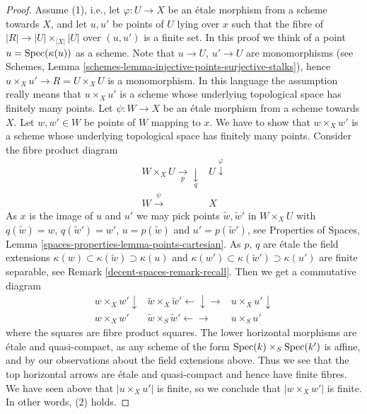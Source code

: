 \begin{proof}
Assume (1), i.e., let $\varphi : U \to X$ be an \'etale morphism from a scheme
towards $X$, and let $u, u'$ be points of $U$ lying over $x$
such that the fibre of $|R| \to |U| \times_{|X|} |U|$ over $(u, u')$
is a finite set. In this proof we think of a point $u = \operatorname{Spec}(\kappa(u))$
as a scheme. Note that $u \to U$, $u' \to U$ are monomorphisms (see
Schemes, Lemma \ref{schemes-lemma-injective-points-surjective-stalks}),
hence $u \times_X u' \to R = U \times_X U$ is a monomorphism.
In this language the assumption really means that
$u \times_X u'$ is a scheme whose underlying topological space has
finitely many points.
Let $\psi : W \to X$ be an \'etale morphism from a scheme towards $X$.
Let $w, w' \in W$ be points of $W$ mapping to $x$.
We have to show that $w \times_X w'$ is a scheme whose underlying topological
space has finitely many points.
Consider the fibre product diagram
$$
\begin{array}{cc}W \times_X U \underset{p}{\longrightarrow}\underset{q}{\downarrow} & U \overset{\varphi}{\downarrow} \\ W \overset{\psi}{\longrightarrow} & X\end{array}
$$
As $x$ is the image of $u$ and $u'$ we may pick points
$\tilde w, \tilde w'$ in $W \times_X U$ with $q(\tilde w) = w$,
$q(\tilde w') = w'$, $u = p(\tilde w)$ and $u' = p(\tilde w')$, see
Properties of Spaces,
Lemma \ref{spaces-properties-lemma-points-cartesian}.
As $p$, $q$ are \'etale the field extensions
$\kappa(w) \subset \kappa(\tilde w) \supset \kappa(u)$ and
$\kappa(w') \subset \kappa(\tilde w') \supset \kappa(u')$ are
finite separable, see Remark \ref{decent-spaces-remark-recall}.
Then we get a commutative diagram
$$
\begin{array}{ccc}w \times_X w' \downarrow & \tilde w \times_X \tilde w' \longleftarrow\downarrow\longrightarrow & u \times_X u' \downarrow \\ w \times_X w' & \tilde w \times_S \tilde w' \longleftarrow\longrightarrow & u \times_S u'\end{array}
$$
where the squares are fibre product squares. The lower horizontal
morphisms are \'etale and quasi-compact, as any scheme of the form
$\operatorname{Spec}(k) \times_S \operatorname{Spec}(k')$ is affine, and by our
observations about the field extensions above.
Thus we see that the top horizontal arrows are \'etale and quasi-compact
and hence have finite fibres.
We have seen above that $|u \times_X u'|$ is finite, so we conclude that
$|w \times_X w'|$ is finite. In other words, (2) holds.


\end{proof}
